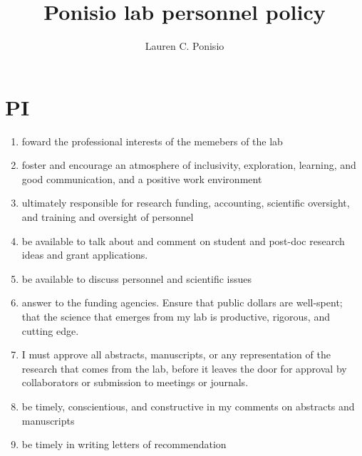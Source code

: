 \documentclass[12pt]{article}
\title{Ponisio lab personnel policy}
\author{Lauren C. Ponisio}
\begin{document}
\maketitle

\section{PI}
\begin{enumerate} 
\item foward the professional interests of the memebers of the lab
\item foster and encourage an atmosphere of inclusivity, exploration,
  learning, and good communication, and a positive work environment
\item ultimately responsible for research funding, accounting,
  scientific oversight, and training and oversight of personnel
\item be available to talk about and comment on student and post-doc
  research ideas and grant applications.
\item be available to discuss personnel and scientific issues 
\item answer to the funding agencies. Ensure that public dollars are
  well-spent; that the science that emerges from my lab is productive,
  rigorous, and cutting edge. 
\item I must approve all abstracts, manuscripts, or any representation
  of the research that comes from the lab, before it leaves the door
  for approval by collaborators or submission to meetings or journals.
\item be timely, conscientious, and constructive in my comments on
  abstracts and manuscripts
\item be timely in writing letters of recommendation
\end{enumerate}
\end{document}
